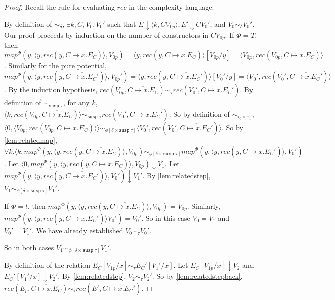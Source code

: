 \begin{proof}
  Recall the rule for evaluating $rec$ in the complexity language:
  \begin{prooftree}
  \end{prooftree}
  By definition of $\sim_\delta$, $\exists k, C, V_0, V_0'$ such that $E \downarrow \langle k, C V_{0p} \rangle, E' \downarrow C V_0'$, and $V_0 \sim_\delta V_0'$.
  Our proof proceeds by induction on the number of constructors in $C V_{0p}$.
  If $\Phi = T$, then $map^\Phi(y, \langle y, rec(y, \overline{C \mapsto x.E_C})\rangle, V_{0p}) = \langle y, rec(y, \overline{C \mapsto x.E_C})\rangle[V_{0p}/y] = \langle V_{0p}, rec(V_{0p}, \overline{C \mapsto x.E_C}) \rangle$.
  Similarly for the pure potential, $map^\Phi(y, \langle y, rec(y, \overline{C \mapsto x.E_C'})\rangle, V_{0p}') = \langle y, rec(y, \overline{C \mapsto x.E_C'})\rangle [V_0'/y] = \langle V_0', rec(V_0', \overline{C \mapsto x.E_C'}) \rangle$.
  By the induction hypothesis, $rec(V_{0p}, \overline{C \mapsto x.E_C}) \sim_\tau rec(V_0', \overline{C \mapsto x.E_C'})$.
  By definition of $\sim_{\texttt{susp }\tau}$, for any $k$, $\langle k, rec(V_{0p}, \overline{C \mapsto x.E_C}) \rangle \sim_{\texttt{susp }\tau} rec(V_0', \overline{C \mapsto x.E_C'})$.
  So by definition of $\sim_{\tau_0 \times \tau_1}$, $\langle 0, \langle V_{0p}, rec(V_{0p}, C \mapsto x.E_C) \rangle\rangle \sim_{\phi[\delta \times \texttt{susp }\tau]} \langle V_0', rec(V_0', \overline{C \mapsto x.E_C'})\rangle$.
  So by \ref{lem:relatedmap}, $\forall k. \langle k, map^\Phi(y, \langle y, rec(y, \overline{C \mapsto x.E_C})\rangle, V_{0p}) \sim_{\phi[\delta \times \texttt{susp }\tau]} map^\Phi(y, \langle y, rec(y, \overline{C \mapsto x.E_C'}) \rangle, V_0')$.
  Let $\langle 0, map^\Phi(y, \langle y, rec(y, \overline{C \mapsto x.E_C})\rangle, V_{0p}) \downarrow V_1$.
  Let $map^\Phi(y, \langle y, rec(y, \overline{C \mapsto x.E_C'}) \rangle, V_0') \downarrow V_1'$.
  By \ref{lem:relatedstep}, $V_1 \sim_{\phi[\delta \times \texttt{susp }\tau]} V_1'$.

  If $\Phi = t$, then $map^\Phi(y, \langle y, rec(y, \overline{C \mapsto x.E_C})\rangle, V_{0p}) = V_{0p}$.
  Similarly, $map^\Phi(y, \langle y, rec(y, \overline{C \mapsto x.E_C'})\rangle V_0') = V_0'$.
  So in this case $V_0 = V_1$ and $V_0' = V_1'$.
  We have already established $V_0 \sim_\tau V_0'$.

  So in both cases $V_1 \sim_{\phi[\delta \times \texttt{susp }\tau]} V_1'$.

  By definition of the relation $E_C[V_{1p}/x] \sim_\tau E_C'[V_1'/x]$.
  Let $E_C[V_{1p}/x] \downarrow V_2$ and $E_C'[V_1'/x] \downarrow V_2'$.
  By \ref{lem:relatedstep}, $V_2 \sim_\tau V_2'$.
  So by \ref{lem:relatedstepback}, $rec(E_p, \overline{C \mapsto x.E_C}) \sim_\tau rec(E', \overline{C \mapsto x.E_C'})$.
\end{proof}
